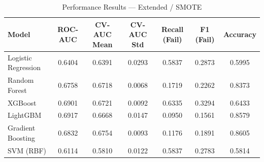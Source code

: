 \begin{table}[htbp]
\caption{Performance Results — Extended / SMOTE}
\label{tab:extended_smote}
\begin{tabular}{lcccccc}
\toprule

Model & ROC-AUC & CV-AUC Mean & CV-AUC Std & Recall (Fail) & F1 (Fail) & Accuracy \\
\midrule

Logistic Regression & 0.6404 & 0.6391 & 0.0293 & 0.5837 & 0.2873 & 0.5995 \\
Random Forest & 0.6758 & 0.6718 & 0.0068 & 0.1719 & 0.2262 & 0.8373 \\
XGBoost & 0.6901 & 0.6721 & 0.0092 & 0.6335 & 0.3294 & 0.6433 \\
LightGBM & 0.6917 & 0.6668 & 0.0147 & 0.0950 & 0.1561 & 0.8579 \\
Gradient Boosting & 0.6832 & 0.6754 & 0.0093 & 0.1176 & 0.1891 & 0.8605 \\
SVM (RBF) & 0.6114 & 0.5810 & 0.0122 & 0.5837 & 0.2783 & 0.5814 \\
\bottomrule

\end{tabular}
\end{table}
